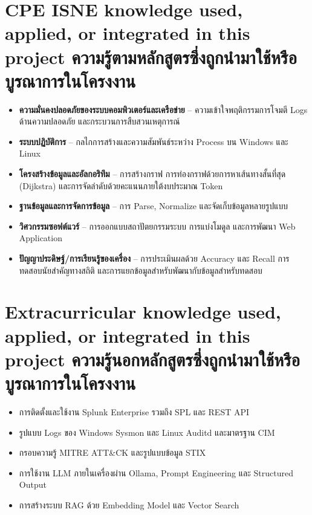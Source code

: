 \section{\ifenglish%
\ifcpe CPE \else ISNE \fi knowledge used, applied, or integrated in this project
\else%
ความรู้ตามหลักสูตรซึ่งถูกนำมาใช้หรือบูรณาการในโครงงาน
\fi
}
\begin{itemize}
  \item \textbf{ความมั่นคงปลอดภัยของระบบคอมพิวเตอร์และเครือข่าย} -- ความเข้าใจพฤติกรรมการโจมตี
        Logs ด้านความปลอดภัย และกระบวนการสืบสวนเหตุการณ์
  \item \textbf{ระบบปฏิบัติการ} -- กลไกการสร้างและความสัมพันธ์ระหว่าง Process บน Windows และ Linux
  \item \textbf{โครงสร้างข้อมูลและอัลกอริทึม} -- การสร้างกราฟ การท่องกราฟด้วยการหาเส้นทางสั้นที่สุด (Dijkstra)
        และการจัดลำดับด้วยคะแนนภายใต้งบประมาณ Token
  \item \textbf{ฐานข้อมูลและการจัดการข้อมูล} -- การ Parse, Normalize และจัดเก็บข้อมูลหลายรูปแบบ
  \item \textbf{วิศวกรรมซอฟต์แวร์} -- การออกแบบสถาปัตยกรรมระบบ การแบ่งโมดูล และการพัฒนา Web Application
  \item \textbf{ปัญญาประดิษฐ์/การเรียนรู้ของเครื่อง} -- การประเมินผลด้วย Accuracy และ Recall การทดสอบนัยสำคัญทางสถิติ
        และการแยกข้อมูลสำหรับพัฒนากับข้อมูลสำหรับทดสอบ
\end{itemize}

\section{\ifenglish%
Extracurricular knowledge used, applied, or integrated in this project
\else%
ความรู้นอกหลักสูตรซึ่งถูกนำมาใช้หรือบูรณาการในโครงงาน
\fi
}
\begin{itemize}
  \item การติดตั้งและใช้งาน Splunk Enterprise รวมถึง SPL และ REST API
  \item รูปแบบ Logs ของ Windows Sysmon และ Linux Auditd และมาตรฐาน CIM
  \item กรอบความรู้ MITRE ATT\&CK และรูปแบบข้อมูล STIX
  \item การใช้งาน LLM ภายในเครื่องผ่าน Ollama, Prompt Engineering และ Structured Output
  \item การสร้างระบบ RAG ด้วย Embedding Model และ Vector Search
\end{itemize}
